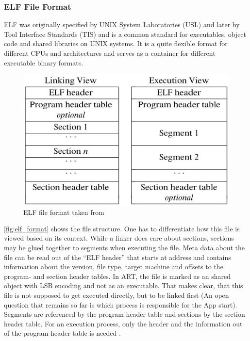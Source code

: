 \subsubsection{ELF File Format}\label{section:elf_file_format}
ELF was originally specified by UNIX System Laboratories
(USL) and later by Tool Interface Standards (TIS) and is a common
standard for executables, object code and shared libraries on UNIX
systems. It is a quite flexible format for different CPUs and
architectures and serves as a container for different
executable binary formats.

\begin{figure}[htb]
  \centering
  \includegraphics[scale=0.4]{figures/elf_format}
  \caption[ELF file format]{ELF file format taken from \parencite{portable_formats_spec}}
  \label{fig:elf_format}
\end{figure}

\autoref{fig:elf_format} shows the file structure.
One has to differentiate how this file is viewed based on its context.
While a linker does care about sections, sections may be
glued together to segments when executing the file.
Meta data about the file can be read out of the ``ELF header''
that starts at address  and contains
information about the version, file type, target machine and
offsets to the program- and section header tables.
In ART, the file is marked as an shared object with LSB encoding
and not as an executable. That makes clear, that this file is not
supposed to get executed directly, but to be linked first
(An open question that remains so far is which process is responsible
for the App start).
Segments are referenced by the program header table and sections
by the section header table. For an execution process, only the header
and the information out of the program header table is needed
\parencite{life_of_binaries}.

